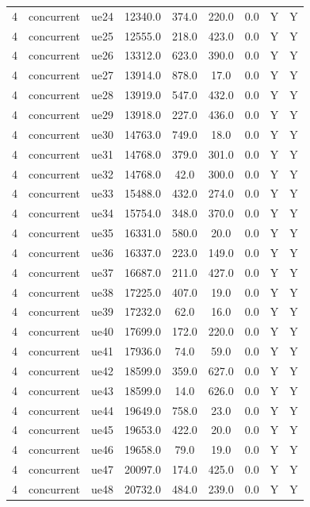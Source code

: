 \begin{table}[ht]
\begin{tabular}{|c|c|c|c|c|c|c|c|c|}
4 & concurrent & ue24 & 12340.0 & 374.0 & 220.0 & 0.0 & Y & Y \\
4 & concurrent & ue25 & 12555.0 & 218.0 & 423.0 & 0.0 & Y & Y \\
4 & concurrent & ue26 & 13312.0 & 623.0 & 390.0 & 0.0 & Y & Y \\
4 & concurrent & ue27 & 13914.0 & 878.0 & 17.0 & 0.0 & Y & Y \\
4 & concurrent & ue28 & 13919.0 & 547.0 & 432.0 & 0.0 & Y & Y \\
4 & concurrent & ue29 & 13918.0 & 227.0 & 436.0 & 0.0 & Y & Y \\
4 & concurrent & ue30 & 14763.0 & 749.0 & 18.0 & 0.0 & Y & Y \\
4 & concurrent & ue31 & 14768.0 & 379.0 & 301.0 & 0.0 & Y & Y \\
4 & concurrent & ue32 & 14768.0 & 42.0 & 300.0 & 0.0 & Y & Y \\
4 & concurrent & ue33 & 15488.0 & 432.0 & 274.0 & 0.0 & Y & Y \\
4 & concurrent & ue34 & 15754.0 & 348.0 & 370.0 & 0.0 & Y & Y \\
4 & concurrent & ue35 & 16331.0 & 580.0 & 20.0 & 0.0 & Y & Y \\
4 & concurrent & ue36 & 16337.0 & 223.0 & 149.0 & 0.0 & Y & Y \\
4 & concurrent & ue37 & 16687.0 & 211.0 & 427.0 & 0.0 & Y & Y \\
4 & concurrent & ue38 & 17225.0 & 407.0 & 19.0 & 0.0 & Y & Y \\
4 & concurrent & ue39 & 17232.0 & 62.0 & 16.0 & 0.0 & Y & Y \\
4 & concurrent & ue40 & 17699.0 & 172.0 & 220.0 & 0.0 & Y & Y \\
4 & concurrent & ue41 & 17936.0 & 74.0 & 59.0 & 0.0 & Y & Y \\
4 & concurrent & ue42 & 18599.0 & 359.0 & 627.0 & 0.0 & Y & Y \\
4 & concurrent & ue43 & 18599.0 & 14.0 & 626.0 & 0.0 & Y & Y \\
4 & concurrent & ue44 & 19649.0 & 758.0 & 23.0 & 0.0 & Y & Y \\
4 & concurrent & ue45 & 19653.0 & 422.0 & 20.0 & 0.0 & Y & Y \\
4 & concurrent & ue46 & 19658.0 & 79.0 & 19.0 & 0.0 & Y & Y \\
4 & concurrent & ue47 & 20097.0 & 174.0 & 425.0 & 0.0 & Y & Y \\
4 & concurrent & ue48 & 20732.0 & 484.0 & 239.0 & 0.0 & Y & Y \\

\end{tabular}
\end{table}
